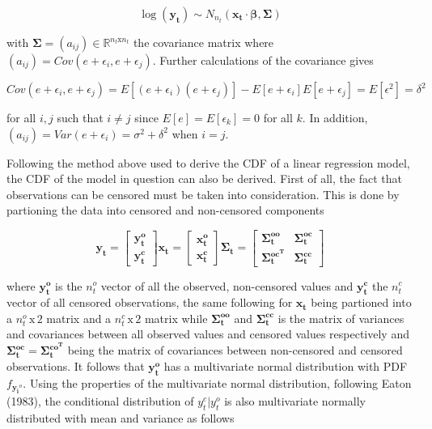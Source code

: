\documentclass[]{article}
\begin{document}
\[
\log(\mathbf{y_t}) \sim N_{n_t}(\mathbf{x_t}\cdot \mathbf{\beta}, \mathbf{\Sigma})
\]

with \(\mathbf{\Sigma} = (a_{ij})\in \mathbb{R}^{n_t \text{x} n_t}\) the
covariance matrix where
\((a_{ij}) = Cov (e + \epsilon_i, e +\epsilon_j)\). Further calculations
of the covariance gives

\[
Cov(e + \epsilon_i, e + \epsilon_j) = E[(e+\epsilon_i)(e+\epsilon_j)] - E[e+\epsilon_i]E[e+\epsilon_j]= E[\epsilon^2] = \delta^2
\]

for all \(i,j\) such that \(i\neq j\) since \(E[e]=E[\epsilon_k]=0\) for
all \(k\). In addition,
\((a_{ij}) = Var(e +\epsilon_i) = \sigma^2 + \delta^2\) when \(i=j\).

Following the method above used to derive the CDF of a linear regression
model, the CDF of the model in question can also be derived. First of
all, the fact that observations can be censored must be taken into
consideration. This is done by partioning the data into censored and
non-censored components

\[
\mathbf{y_t}=
    \begin{bmatrix}
           \mathbf{y_t^o} \\
           \mathbf{y_t^c} \end{bmatrix}
           \mathbf{x_t} =  \begin{bmatrix}
           \mathbf{x_t^o} \\
           \mathbf{x_t^c} \end{bmatrix}
         \mathbf{\Sigma_t} = \begin{bmatrix}
           \mathbf{\Sigma_t^{oo}} & \mathbf{\Sigma_t^{oc}}\\
           \mathbf{\Sigma_t^{oc^{T}}} & \mathbf{\Sigma_t^{cc}}
         \end{bmatrix}
\]

where \(\mathbf{y_t^o}\) is the \(n_t^o\) vector of all the observed,
non-censored values and \(\mathbf{y_t^c}\) the \(n_t^c\) vector of all
censored observations, the same following for \(\mathbf{x_t}\) being
partioned into a \(n_t^o \, \text{x} \, 2\) matrix and a
\(n_t^c \, \text{x} \, 2\) matrix while \(\mathbf{\Sigma_t^{oo}}\) and
\(\mathbf{\Sigma_t^{cc}}\) is the matrix of variances and covariances
between all observed values and censored values respectively and
\(\mathbf{\Sigma_t^{oc}}=\mathbf{\Sigma_t^{co^{T}}}\) being the matrix
of covariances between non-censored and censored observations. It
follows that \(\mathbf{y_t^o}\) has a multivariate normal distribution
with PDF \(f_{\mathbf{y_i}^o}\). Using the properties of the
multivariate normal distribution, following Eaton (1983), the
conditional distribution of \(y_t^c|y_t^o\) is also multivariate
normally distributed with mean and variance as follows
\end{document}
